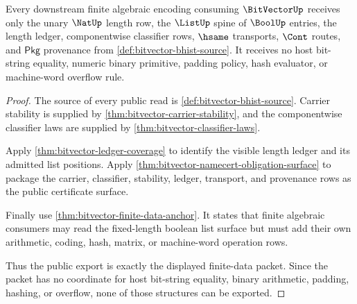 \begin{theorem}\label{thm:bitvector-public-finite-algebra-export}
Every downstream finite algebraic encoding consuming $\BitVectorUp$ receives
only the unary $\NatUp$ length row, the $\ListUp$ spine of $\BoolUp$ entries,
the length ledger, componentwise classifier rows, $\hsame$ transports, $\Cont$
routes, and $\mathsf{Pkg}$ provenance from
\autoref{def:bitvector-bhist-source}. It receives no host bit-string equality,
numeric binary primitive, padding policy, hash evaluator, or machine-word
overflow rule.
\end{theorem}
\begin{proof}
The source of every public read is \autoref{def:bitvector-bhist-source}. Carrier
stability is supplied by \autoref{thm:bitvector-carrier-stability}, and the
componentwise classifier laws are supplied by
\autoref{thm:bitvector-classifier-laws}.

Apply \autoref{thm:bitvector-ledger-coverage} to identify the visible length
ledger and its admitted list positions. Apply
\autoref{thm:bitvector-namecert-obligation-surface} to package the carrier,
classifier, stability, ledger, transport, and provenance rows as the public
certificate surface.

Finally use \autoref{thm:bitvector-finite-data-anchor}. It states that finite
algebraic consumers may read the fixed-length boolean list surface but must add
their own arithmetic, coding, hash, matrix, or machine-word operation rows.

Thus the public export is exactly the displayed finite-data packet. Since the
packet has no coordinate for host bit-string equality, binary arithmetic,
padding, hashing, or overflow, none of those structures can be exported.
\end{proof}


